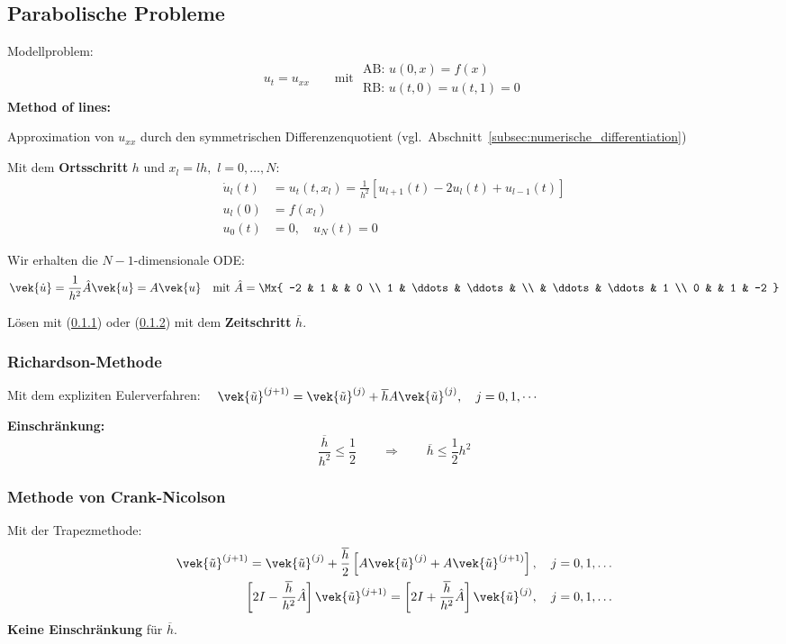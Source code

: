 	\subsection{Parabolische Probleme}
		Modellproblem:
		\[
			u_t = u_{xx} \qquad \text{mit } \begin{array}{l}
				\text{AB: } u(0,x)=f(x) \\
				\text{RB: } u(t,0) = u(t,1)=0
			\end{array}
		\]
		\textbf{Method of lines:}
		\begin{tightenumerate}
			\item Approximation von $u_{xx}$ durch den symmetrischen Differenzenquotient (vgl.~Abschnitt~\ref{subsec:numerische_differentiation})
			\item Mit dem \textbf{Ortsschritt} $h$ und $x_l = lh,$ $l=0,\dots, N$:
				\begin{align*}
					\dot u_l(t) &= u_t(t,x_l) = \frac{1}{h^2}\left[ u_{l+1}(t) - 2u_l(t) + u_{l-1}(t)\right] \\
					u_l(0) &= f(x_l) \\
					u_0(t) &= 0,\quad u_N(t) = 0
				\end{align*}
			\item Wir erhalten die $N-1$-dimensionale ODE:
				\[
					\vek{\dot u} = \frac{1}{h^2} \hat A \vek{u} = A \vek{u}
					\quad \text{mit }
					\hat A = \Mx{
						-2 &  1     &        &  0 \\
						 1 & \ddots & \ddots &    \\
						   & \ddots & \ddots &  1 \\
						 0 &        &  1     & -2
					}
				\]
			\item Lösen mit (\ref{richardson}) oder (\ref{crank}) mit dem \textbf{Zeitschritt} $\overline{h}$.
		\end{tightenumerate}

		\subsubsection{Richardson-Methode}
			\label{richardson}
			Mit dem expliziten Eulerverfahren: $\quad \vek{\tilde u}^{(j+1)}= \vek{\tilde u}^{(j)} + \overline{h}A\vek{\tilde u}^{(j)}, \quad j=0,1,\cdots$

			\textbf{Einschränkung:}
			\[
				\frac{\overline{h}}{h^2} \leq \frac{1}{2} \qquad \Rightarrow\qquad \overline{h}\leq \frac{1}{2} h^2
			\]

		\subsubsection{Methode von Crank-Nicolson}
			\label{crank}
			Mit der Trapezmethode:
			\begin{align*}
				\vek{\tilde u}^{(j+1)} = \vek{\tilde u}^{(j)} + \frac{\overline{h}}{2}\left[A\vek{\tilde u}^{(j)} + A\vek{\tilde u}^{(j+1)}\right], \quad j=0,1,\dots \\
				\left[ 2I - \frac{\overline{h}}{h^2}\hat A\right]\vek{\tilde u}^{(j+1)} = \left[ 2I + \frac{\overline{h}}{h^2}\hat A\right]\vek{\tilde u}^{(j)}, \quad j=0,1,\dots
			\end{align*}
			\textbf{Keine Einschränkung} für $\overline{h}$.

